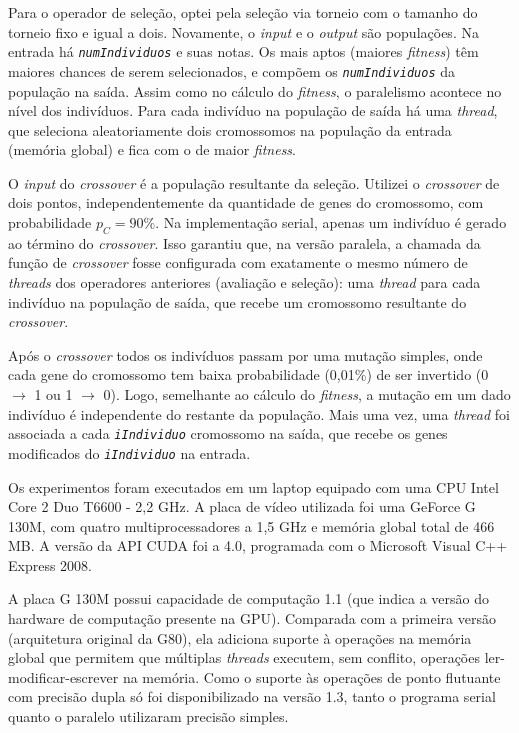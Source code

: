 	Para o operador de seleção, optei pela seleção via torneio com o tamanho do torneio fixo e igual a dois. Novamente, o \emph{input} e o \emph{output} são populações. Na entrada há \textit{\texttt{numIndividuos}} e suas notas. Os mais aptos (maiores \emph{fitness}) têm maiores chances de serem selecionados, e compõem os \textit{\texttt{numIndividuos}} da população na saída. Assim como no cálculo do \emph{fitness}, o paralelismo acontece no nível dos indivíduos. Para cada indivíduo na população de saída há uma \emph{thread}, que seleciona aleatoriamente dois cromossomos na população da entrada (memória global) e fica com o de maior \emph{fitness}.

O \emph{input} do \emph{crossover} é a população resultante da seleção. Utilizei o \emph{crossover} de dois pontos, independentemente da quantidade de genes do cromossomo, com probabilidade $p_C = 90\%$. Na implementação serial, apenas um indivíduo é gerado ao término do \emph{crossover}. Isso garantiu que, na versão paralela, a chamada da função de \emph{crossover} fosse configurada com exatamente o mesmo número de \emph{threads} dos operadores anteriores (avaliação e seleção): uma \emph{thread} para cada indivíduo na população de saída, que recebe um cromossomo resultante do \emph{crossover}.

Após o \emph{crossover} todos os indivíduos passam por uma mutação simples, onde cada gene do cromossomo tem baixa probabilidade (0,01\%) de ser invertido (0 $\rightarrow$ 1 ou 1 $\rightarrow$ 0). Logo, semelhante ao cálculo do \emph{fitness}, a mutação em um dado indivíduo é independente do restante da população. Mais uma vez, uma \emph{thread} foi associada a cada \textit{\texttt{iIndividuo}} cromossomo na saída, que recebe os genes modificados do \textit{\texttt{iIndividuo}} na entrada. 

	Os experimentos foram executados em um laptop equipado com uma CPU Intel Core 2 Duo T6600 - 2,2 GHz. A placa de vídeo utilizada foi uma GeForce G 130M, com quatro multiprocessadores a 1,5 GHz e memória global total de 466 MB. A versão da API CUDA foi a 4.0, programada com o Microsoft Visual C++ Express 2008.
	
	A placa G 130M possui capacidade de computação 1.1 (que indica a versão do hardware de computação presente na GPU). Comparada com a primeira versão (arquitetura original da G80), ela adiciona suporte à operações na memória global que permitem que múltiplas \emph{threads} executem, sem conflito, operações ler-modificar-escrever na memória. Como o suporte às operações de ponto flutuante com precisão dupla só foi disponibilizado na versão 1.3, tanto o programa serial quanto o paralelo utilizaram precisão simples.
	
